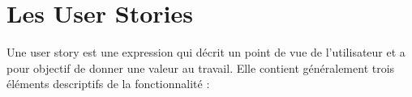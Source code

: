 




\section{Les User Stories}
Une user story est une expression qui décrit un point de vue de l'utilisateur et a pour objectif de donner une valeur au travail. Elle contient généralement trois éléments descriptifs de la fonctionnalité : 

